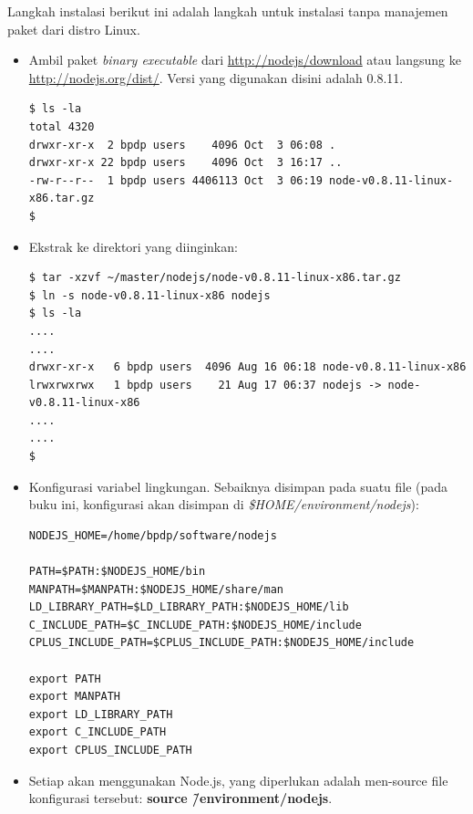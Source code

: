 Langkah instalasi berikut ini adalah langkah untuk instalasi tanpa manajemen paket dari distro Linux.
\begin{itemize}
  \item Ambil paket \textit{binary executable} dari \url{http://nodejs/download} atau langsung ke \url{http://nodejs.org/dist/}. Versi yang digunakan disini adalah 0.8.11.

\lstset{language=bash,caption=Hasil dari download Node.js}
\begin{lstlisting}
$ ls -la
total 4320
drwxr-xr-x  2 bpdp users    4096 Oct  3 06:08 .
drwxr-xr-x 22 bpdp users    4096 Oct  3 16:17 ..
-rw-r--r--  1 bpdp users 4406113 Oct  3 06:19 node-v0.8.11-linux-x86.tar.gz
$ 
\end{lstlisting}

  \item Ekstrak ke direktori yang diinginkan:

\lstset{language=bash,caption=Ekstraksi Node.js}
\begin{lstlisting}
$ tar -xzvf ~/master/nodejs/node-v0.8.11-linux-x86.tar.gz
$ ln -s node-v0.8.11-linux-x86 nodejs
$ ls -la
....
....
drwxr-xr-x   6 bpdp users  4096 Aug 16 06:18 node-v0.8.11-linux-x86
lrwxrwxrwx   1 bpdp users    21 Aug 17 06:37 nodejs -> node-v0.8.11-linux-x86
....
....
$ 
\end{lstlisting}

  \item Konfigurasi variabel lingkungan. Sebaiknya disimpan pada suatu file (pada buku ini, konfigurasi akan disimpan di \textit{\$HOME/environment/nodejs}):

\lstset{language=bash,caption=Konfigurasi variabel lingkungan Node.js}
\begin{lstlisting}
NODEJS_HOME=/home/bpdp/software/nodejs
 
PATH=$PATH:$NODEJS_HOME/bin
MANPATH=$MANPATH:$NODEJS_HOME/share/man
LD_LIBRARY_PATH=$LD_LIBRARY_PATH:$NODEJS_HOME/lib
C_INCLUDE_PATH=$C_INCLUDE_PATH:$NODEJS_HOME/include
CPLUS_INCLUDE_PATH=$CPLUS_INCLUDE_PATH:$NODEJS_HOME/include
 
export PATH
export MANPATH
export LD_LIBRARY_PATH
export C_INCLUDE_PATH
export CPLUS_INCLUDE_PATH
\end{lstlisting}

  \item Setiap akan menggunakan Node.js, yang diperlukan adalah men-source file konfigurasi tersebut: \textbf{source \~/environment/nodejs}.
\end{itemize}

